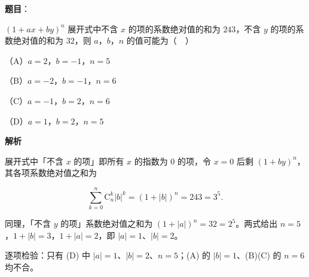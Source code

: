 \begin{answer}

\textbf{题目}：

$(1+ax+by)^n$ 展开式中不含 $x$ 的项的系数绝对值的和为 $243$，不含 $y$ 的项的系数绝对值的和为 $32$，则 $a$，$b$，$n$ 的值可能为（　）

（A）$a=2$，$b=-1$，$n=5$

（B）$a=-2$，$b=-1$，$n=6$

（C）$a=-1$，$b=2$，$n=6$

（D）$a=1$，$b=2$，$n=5$

\textbf{解析}

展开式中「不含 $x$ 的项」即所有 $x$ 的指数为 $0$ 的项，令 $x=0$ 后剩 $(1+by)^n$，其各项系数绝对值之和为

\nopagebreak[4]
\[\sum_{k=0}^{n}\mathrm C_n^k|b|^k=(1+|b|)^n=243=3^5.\]

同理，「不含 $y$ 的项」系数绝对值之和为 $(1+|a|)^n=32=2^5$。两式给出 $n=5$，$1+|b|=3$，$1+|a|=2$，即 $|a|=1$、$|b|=2$。

逐项检验：只有 (D) 中 $|a|=1$、$|b|=2$、$n=5$；(A) 的 $|b|=1$、(B)(C) 的 $n=6$ 均不合。


\end{answer}
